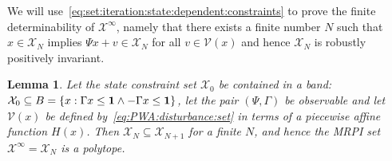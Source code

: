 \documentclass[letterpaper, 10pt, conference]{ieeeconf} %
\newtheorem{thm}{Lemma}[section]
\begin{document}
%
We will use~\eqref{eq:set:iteration:state:dependent:constraints} to prove the finite determinability of
$\mathcal X^\infty$, namely that there exists a finite number $N$ such that $x\in\mathcal X_N$ implies
$\Psi x + v \in\mathcal X_N$ for all $v\in\mathcal V(x)$ and hence $\mathcal X_N$ is robustly positively invariant.
%
\begin{thm}\label{thm:finite:MRPI:set:state:dependable}
Let the state constraint set $\mathcal X_0$ be contained in a band: $\mathcal X_0\subseteq B=\{x:\Gamma x\leq{\bf{1}}\wedge 
-\Gamma x\leq{\bf{1}}\}$, let the pair $(\Psi,\Gamma)$ be observable and let $\mathcal V(x)$ be defined by~\eqref{eq:PWA:disturbance:set}
in terms of a piecewise affine function $H(x)$.
Then $\mathcal X_N\subseteq \mathcal X_{N+1}$ for a finite $N$, and hence the MRPI set $\mathcal X^\infty 
=\mathcal X_N$ is a polytope.
\end{thm}
%
\end{document}
